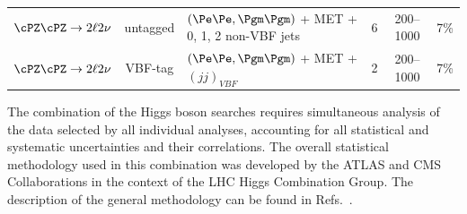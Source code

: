 \begin{table}[htbp]
\begin{center}
\begin{tabular}{|l|c|l| ccc|}
$\cPZ\cPZ \to 2\ell 2\nu$        & untagged  &  $(\Pe\Pe,\Pgm\Pgm)$ + MET + 0, 1, 2 non-VBF jets                                        & 6       & 200--1000         & 7\%   \\
$\cPZ\cPZ \to 2\ell 2\nu$        & VBF-tag    &  $(\Pe\Pe,\Pgm\Pgm)$ + MET + $(jj)_{VBF}$                                                           & 2         & 200--1000         & 7\%   \\
\hline%
\end{tabular}
\end{center}
\end{table}


The combination of the Higgs boson searches
requires simultaneous analysis of the data selected by all individual analyses,
accounting for all statistical and systematic uncertainties and their correlations.
The overall statistical methodology used in this combination was developed 
by the ATLAS and CMS Collaborations in the context of the LHC Higgs Combination Group.
The description of the general methodology can be found in Refs.~\cite{LHC-HCG-Report, CMScombFeb2012}. 

